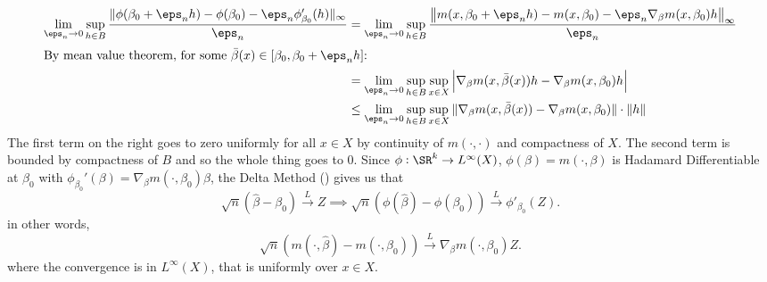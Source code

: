 \begin{example}
	\begin{align*}
		\lim_{\eps_n\to 0}\sup_{h\in B} \frac{\|\phi(\beta_0+\eps_nh)-\phi(\beta_0) -\eps_n\phi'_{\beta_0}(h)\|_\infty}{\eps_n} 
		&= \lim_{\eps_n\to 0}\sup_{h\in B}\frac{\left\|m(x,\beta_0+\eps_nh)-m(x,\beta_0)-\eps_n\nabla_\beta m(x,\beta_0)h\right\|_\infty}{\eps_n}\\
		\intertext{By mean value theorem, for some \(\bar{\beta}(x)\in [\beta_0, \beta_0+ \eps_nh]\):}
		&= \lim_{\eps_n\to0}\sup_{h\in B}\sup_{x\in X}\left|\nabla_\beta m(x,\bar\beta(x))h-\nabla_\beta m(x,\beta_0)h\right|\\
		&\leq \lim_{\eps_n\to 0}\sup_{h\in B}\sup_{x\in X}\|\nabla_\beta m(x,\bar\beta(x))-\nabla_\beta m(x,\beta_0)\|\cdot\|h\|
	\end{align*}
	The first term on the right goes to zero uniformly for all \(x\in X\) by continuity of \(m(\cdot,\cdot)\) and compactness of  \(X\). The second term is bounded by compactness of  \(B\) and so the whole thing goes to 0. Since \(\phi:\SR^k\to L^\infty(X)\), \(\phi(\beta)=m(\cdot,\beta)\) is Hadamard Differentiable at \(\beta_0\) with \(\phi_{\beta_0}'(\beta) = \nabla_\beta m(\cdot,\beta_0)\beta\), the Delta Method () gives us that
	\[
		\sqrt{n}\left(\widehat\beta-\beta_0\right)\overset{L}{\to} Z \implies \sqrt{n}(\phi(\widehat\beta)-\phi(\beta_0))\overset{L}{\to} \phi'_{\beta_0}(Z)
	.\] 
	in other words,
	 \[
		 \sqrt{n}\left(m(\cdot, \widehat\beta)-m(\cdot,\beta_0)\right)\overset{L}{\to}\nabla_\beta m(\cdot,\beta_0)Z
	.\] 
	where the convergence is in \(L^\infty(X)\), that is uniformly over  \(x\in X\).
\end{example}

